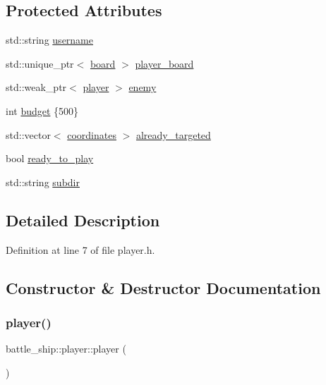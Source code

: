 \subsection*{Protected Attributes}
\begin{DoxyCompactItemize}
\item 
std\+::string \hyperlink{classbattle__ship_1_1player_aed786567891bcafecb8610e12fb5d413}{username}
\item 
std\+::unique\+\_\+ptr$<$ \hyperlink{classbattle__ship_1_1board}{board} $>$ \hyperlink{classbattle__ship_1_1player_a7a463dddbc0cd8e9dfa3d2c41687e59e}{player\+\_\+board}
\item 
std\+::weak\+\_\+ptr$<$ \hyperlink{classbattle__ship_1_1player}{player} $>$ \hyperlink{classbattle__ship_1_1player_af01292346caaf209039b6490ae18d8aa}{enemy}
\item 
int \hyperlink{classbattle__ship_1_1player_a01f047aac5fcca92ff1e42d4d1e398c9}{budget} \{500\}
\item 
std\+::vector$<$ \hyperlink{structbattle__ship_1_1coordinates}{coordinates} $>$ \hyperlink{classbattle__ship_1_1player_ac0905b76a660cd06e5fd45f4960d48f9}{already\+\_\+targeted}
\item 
bool \hyperlink{classbattle__ship_1_1player_a48a3f8c692c7ea1def384c39b9b65e85}{ready\+\_\+to\+\_\+play}
\item 
std\+::string \hyperlink{classbattle__ship_1_1player_a5cb155ee3d722244c44bf71e5e2440c4}{subdir}
\end{DoxyCompactItemize}


\subsection{Detailed Description}


Definition at line 7 of file player.\+h.



\subsection{Constructor \& Destructor Documentation}
\mbox{\label{classbattle__ship_1_1player_a54df3c03653a24049b9629ce5c55fafa}} 
\subsubsection{\texorpdfstring{player()}{player()}\hspace{0.1cm}{\footnotesize\ttfamily [1/2]}}
{\footnotesize\ttfamily battle\+\_\+ship\+::player\+::player (\begin{DoxyParamCaption}{ }\end{DoxyParamCaption})\hspace{0.3cm}{\ttfamily [default]}}

